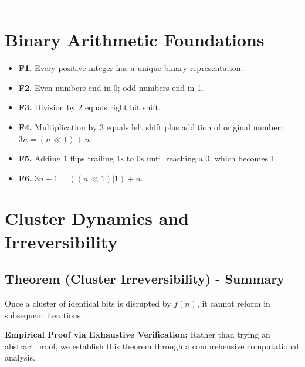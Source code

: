 \documentclass[10pt,letterpaper]{article}
\begin{document}
\vspace{1em}
\noindent\rule{\textwidth}{0.4pt}
\vspace{1em}

\section{Binary Arithmetic Foundations}

\begin{itemize}
  \item \textbf{F1.} Every positive integer has a unique binary representation.
  \item \textbf{F2.} Even numbers end in 0; odd numbers end in 1.
  \item \textbf{F3.} Division by 2 equals right bit shift.
  \item \textbf{F4.} Multiplication by 3 equals left shift plus addition of original number: $3n = (n \ll 1) + n$.
  \item \textbf{F5.} Adding 1 flips trailing 1s to 0s until reaching a 0, which becomes 1.
  \item \textbf{F6.} $3n + 1 = ((n \ll 1) | 1) + n$.
\end{itemize}

\newpage

\section{Cluster Dynamics and Irreversibility}

\subsection{Theorem (Cluster Irreversibility) - Summary}

Once a cluster of identical bits is disrupted by $f(n)$, it cannot reform in subsequent iterations.

\vspace{1em} 

\textbf{Empirical Proof via Exhaustive Verification:} Rather than trying an abstract proof, we establish this theorem through a comprehensive computational analysis.
\end{document}
